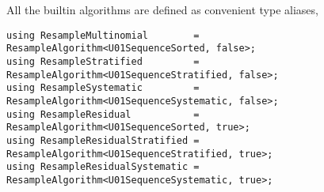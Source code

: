 All the builtin algorithms are defined as convenient type aliases,
\begin{verbatim}
using ResampleMultinomial        = ResampleAlgorithm<U01SequenceSorted, false>;
using ResampleStratified         = ResampleAlgorithm<U01SequenceStratified, false>;
using ResampleSystematic         = ResampleAlgorithm<U01SequenceSystematic, false>;
using ResampleResidual           = ResampleAlgorithm<U01SequenceSorted, true>;
using ResampleResidualStratified = ResampleAlgorithm<U01SequenceStratified, true>;
using ResampleResidualSystematic = ResampleAlgorithm<U01SequenceSystematic, true>;
\end{verbatim}

